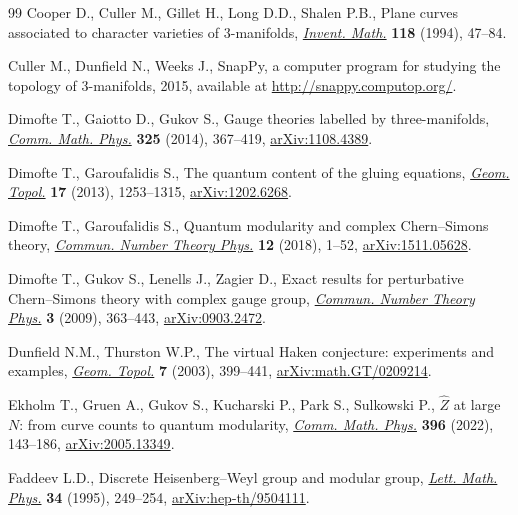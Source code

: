 \documentclass[pdftex]{sigma}
\numberwithin{equation}{section}
\begin{document}
\begin{thebibliography}{99}
Cooper D., Culler M., Gillet H., Long D.D., Shalen P.B., Plane curves
 associated to character varieties of {$3$}-manifolds, \href{https://doi.org/10.1007/BF01231526}{\textit{Invent. Math.}}
 \textbf{118} (1994), 47--84.

Culler M., Dunfield N., Weeks J., Snap{P}y, a computer program for studying the
 topology of $3$-manifolds, 2015, available at
 \url{http://snappy.computop.org/}.

Dimofte T., Gaiotto D., Gukov S., Gauge theories labelled by three-manifolds,
 \href{https://doi.org/10.1007/s00220-013-1863-2}{\textit{Comm. Math. Phys.}} \textbf{325} (2014), 367--419, \href{https://arxiv.org/abs/1108.4389}{arXiv:1108.4389}.

Dimofte T., Garoufalidis S., The quantum content of the gluing equations,
  \href{https://doi.org/10.2140/gt.2013.17.1253}{\textit{Geom. Topol.}} \textbf{17} (2013), 1253--1315, \href{https://arxiv.org/abs/1202.6268}{arXiv:1202.6268}.

Dimofte T., Garoufalidis S., Quantum modularity and complex {C}hern--{S}imons
 theory, \href{https://doi.org/10.4310/CNTP.2018.v12.n1.a1}{\textit{Commun. Number Theory Phys.}} \textbf{12} (2018), 1--52,
 \href{https://arxiv.org/abs/1511.05628}{arXiv:1511.05628}.

Dimofte T., Gukov S., Lenells J., Zagier D., Exact results for perturbative
 {C}hern--{S}imons theory with complex gauge group, \href{https://doi.org/10.4310/CNTP.2009.v3.n2.a4}{\textit{Commun. Number
 Theory Phys.}} \textbf{3} (2009), 363--443, \href{https://arxiv.org/abs/0903.2472}{arXiv:0903.2472}.

Dunfield N.M., Thurston W.P., The virtual {H}aken conjecture: experiments and
 examples, \href{https://doi.org/10.2140/gt.2003.7.399}{\textit{Geom. Topol.}} \textbf{7} (2003), 399--441,
 \href{https://arxiv.org/abs/math.GT/0209214}{arXiv:math.GT/0209214}.

Ekholm T., Gruen A., Gukov S., Kucharski P., Park S., Sulkowski P.,
 {$\widehat{Z}$} at large {$N$}: from curve counts to quantum modularity,
 \href{https://doi.org/10.1007/s00220-022-04469-9}{\textit{Comm. Math. Phys.}} \textbf{396} (2022), 143--186,
 \href{https://arxiv.org/abs/2005.13349}{arXiv:2005.13349}.

Faddeev L.D., Discrete {H}eisenberg--{W}eyl group and modular group,
  \href{https://doi.org/10.1007/BF01872779}{\textit{Lett. Math. Phys.}} \textbf{34} (1995), 249--254,
 \href{https://arxiv.org/abs/hep-th/9504111}{arXiv:hep-th/9504111}.


\end{thebibliography}
\end{document}
